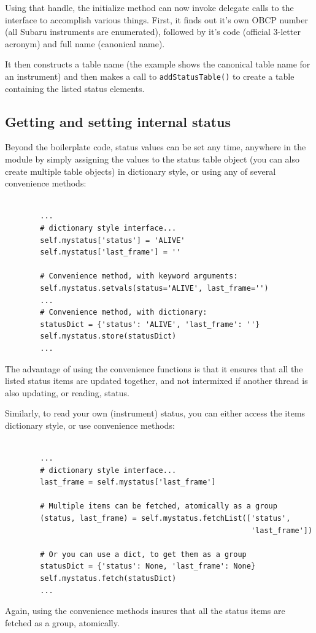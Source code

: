 \documentclass[11pt]{report}
\begin{document}
Using that handle, the initialize method can now invoke delegate calls
to the interface to accomplish various things. First, it finds out it's
own OBCP number (all Subaru instruments are enumerated), followed by
it's code (official 3-letter acronym) and full name (canonical name). 

It then constructs a table name (the example shows the canonical table
name for an instrument) and then makes a call to {\tt addStatusTable()}
to create a table containing the listed status elements. 

\subsection{Getting and setting internal status}
Beyond the boilerplate code, status values can be set any time, anywhere
in the module by simply assigning the values to the status table object
(you can also create multiple table objects) in dictionary style, or
using any of several convenience methods: 
\begin{verbatim}

        ...
        # dictionary style interface...
        self.mystatus['status'] = 'ALIVE'
        self.mystatus['last_frame'] = ''

        # Convenience method, with keyword arguments:
        self.mystatus.setvals(status='ALIVE', last_frame='')
        ...
        # Convenience method, with dictionary:
        statusDict = {'status': 'ALIVE', 'last_frame': ''}
        self.mystatus.store(statusDict)
        ...

\end{verbatim}
The advantage of using the convenience functions is that it ensures that
all the listed status items are updated together, and not intermixed if
another thread is also updating, or reading, status. 

Similarly, to read your own (instrument) status, you can either access
the items dictionary style, or use convenience methods: 
\begin{verbatim}

        ...
        # dictionary style interface...
        last_frame = self.mystatus['last_frame']

        # Multiple items can be fetched, atomically as a group
        (status, last_frame) = self.mystatus.fetchList(['status',
                                                        'last_frame'])

        # Or you can use a dict, to get them as a group
        statusDict = {'status': None, 'last_frame': None}
        self.mystatus.fetch(statusDict)
        ...

\end{verbatim}
Again, using the convenience methods insures that all the status items
are fetched as a group, atomically. 
\end{document}
